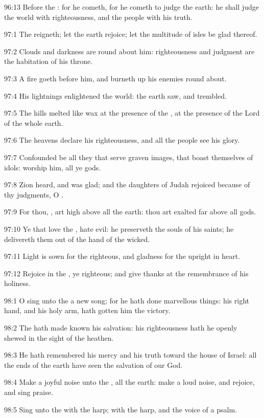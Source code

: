 96:13 Before the \LORD: for he cometh, for he cometh to judge the earth: he shall judge the world with righteousness, and the people with his truth.



97:1 The \LORD reigneth; let the earth rejoice; let the multitude of isles be glad thereof.

97:2 Clouds and darkness are round about him: righteousness and judgment are the habitation of his throne.

97:3 A fire goeth before him, and burneth up his enemies round about.

97:4 His lightnings enlightened the world: the earth saw, and trembled.

97:5 The hills melted like wax at the presence of the \LORD, at the presence of the Lord of the whole earth.

97:6 The heavens declare his righteousness, and all the people see his glory.

97:7 Confounded be all they that serve graven images, that boast themselves of idols: worship him, all ye gods.

97:8 Zion heard, and was glad; and the daughters of Judah rejoiced because of thy judgments, O \LORD.

97:9 For thou, \LORD, art high above all the earth: thou art exalted far above all gods.

97:10 Ye that love the \LORD, hate evil: he preserveth the souls of his saints; he delivereth them out of the hand of the wicked.

97:11 Light is sown for the righteous, and gladness for the upright in heart.

97:12 Rejoice in the \LORD, ye righteous; and give thanks at the remembrance of his holiness.



98:1 O sing unto the \LORD a new song; for he hath done marvellous things: his right hand, and his holy arm, hath gotten him the victory.

98:2 The \LORD hath made known his salvation: his righteousness hath he openly shewed in the sight of the heathen.

98:3 He hath remembered his mercy and his truth toward the house of Israel: all the ends of the earth have seen the salvation of our God.

98:4 Make a joyful noise unto the \LORD, all the earth: make a loud noise, and rejoice, and sing praise.

98:5 Sing unto the \LORD with the harp; with the harp, and the voice of a psalm.


